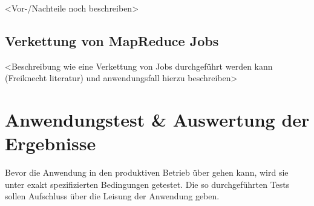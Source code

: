 <Vor-/Nachteile noch beschreiben>

\subsection{Verkettung von MapReduce Jobs}


<Beschreibung wie eine Verkettung von Jobs durchgeführt werden kann (Freiknecht literatur) und anwendungsfall hierzu beschreiben>




\section{Anwendungstest \& Auswertung der Ergebnisse}
Bevor die Anwendung in den produktiven Betrieb über gehen kann, wird sie unter exakt spezifizierten Bedingungen getestet. Die so durchgeführten Tests sollen Aufschluss über die Leisung der Anwendung geben.

